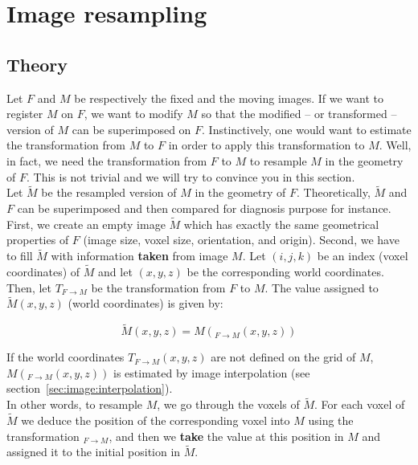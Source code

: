 \section{Image resampling}


\subsection{Theory}
\label{subsec:registration:resampling:theory}

Let $F$ and $M$ be respectively the fixed and the moving images. If we want to register $M$ on $F$, we want to modify $M$ so that the modified -- or transformed -- version of $M$ can be superimposed on $F$. Instinctively, one would want to estimate the transformation from $M$ to $F$ in order to apply this transformation to $M$. Well, in fact, we need the transformation from $F$ to $M$ to resample $M$ in the geometry of $F$. This is not trivial and we will try to convince you in this section.
\\
Let $\widetilde{M}$ be the resampled version of $M$ in the geometry of $F$. Theoretically, $\widetilde{M}$ and $F$ can be superimposed and then compared for diagnosis purpose for instance. First, we create an empty image $\widetilde{M}$ which has exactly the same geometrical properties of $F$ (image size, voxel size, orientation, and origin). Second, we have to fill $\widetilde{M}$ with information \textbf{taken} from image $M$. Let $(i,j,k)$ be an index (voxel coordinates) of $\widetilde{M}$ and let $(x,y,z)$ be the corresponding world coordinates. Then, let $T_{F \rightarrow M}$ be the transformation from $F$ to $M$. The value assigned to $\widetilde{M}(x,y,z)$ (world coordinates) is given by:

\begin{equation}
\widetilde{M}(x,y,z) = M(_{F \rightarrow M}(x,y,z))
\label{eq:registration:resampling:1}
\end{equation}

If the world coordinates $T_{F \rightarrow M}(x,y,z)$ are not defined on the grid of $M$, $M(_{F \rightarrow M}(x,y,z))$ is estimated by image interpolation (see section~\ref{sec:image:interpolation}).
\\
In other words, to resample $M$, we go through the voxels of $\widetilde{M}$. For each voxel of $\widetilde{M}$ we deduce the position of the corresponding voxel into $M$ using the transformation $_{F \rightarrow M}$, and then we \textbf{take} the value at this position in $M$ and assigned it to the initial position in $\widetilde{M}$.
\\

